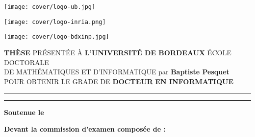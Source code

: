 \newcommand{\BXexam}[5]{#1 \textsc{#2} \dotfill & #3, #4 \dotfill & #5 \\}


\pagestyle{empty}

\begin{titlepage}
    \begin{center}

        \vspace*{-96pt}

        \begin{minipage}[c]{0.3\textwidth}
            \centering
            \texttt{[image: cover/logo-ub.jpg]}
        \end{minipage}
        \hfill
        \begin{minipage}[c]{0.25\textwidth}
            \centering
            \texttt{[image: cover/logo-inria.png]}
        \end{minipage}
        \hfill
        \begin{minipage}[c]{0.2\textwidth}
            \centering
            \texttt{[image: cover/logo-bdxinp.jpg]}
        \end{minipage}
        \vfill
        \vfill
        \vfill
        \vfill

        \huge  {\bf THÈSE}
        \vfill
        \large PRÉSENTÉE À
        \vfill
        \Large  {\bf L'UNIVERSITÉ DE BORDEAUX}
        \vfill
        \Large ÉCOLE DOCTORALE\\DE MATHÉMATIQUES ET D'INFORMATIQUE
        \vfill
        \Large par {\bf Baptiste Pesquet}
        \vfill
        \large POUR OBTENIR LE GRADE DE
        \vfill
        \Large {\bf DOCTEUR}
        \vfill
        \Large {\bf EN INFORMATIQUE}
        \vfill
        \rule{4em}{1pt}
        \vfill
        \Large {\bf \thesisTitleFrench}
        \vfill
        \rule{4em}{1pt}
    \end{center}

    \vfill


    {\bf Soutenue le } \thesisDate

    \vfill

    {\bf Devant la commission d'examen composée de :}


\end{titlepage}
